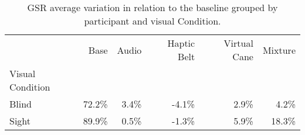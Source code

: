
\begin{table}[!htb]
\centering
\caption{GSR average variation in relation to the baseline grouped by participant and visual Condition.}
\label{tab:gsr_var_average_group}
\begin{tabular}{lrrrrr}
\toprule
{} &    Base &  Audio & Haptic Belt & Virtual Cane & Mixture \\
Visual Condition &         &        &             &              &         \\
\midrule
Blind            &  72.2\% &  3.4\% &      -4.1\% &        2.9\% &   4.2\% \\
Sight            &  89.9\% &  0.5\% &      -1.3\% &        5.9\% &  18.3\% \\
\bottomrule
\end{tabular}
\end{table}

